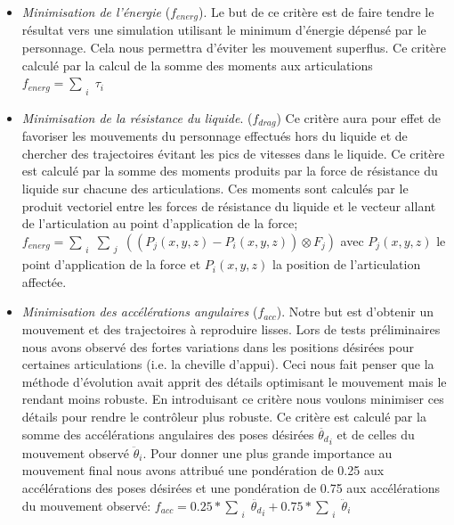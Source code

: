 \documentclass[runningheads,a4paper]{llncs}
\begin{document}
\begin{itemize}
\item{\textit{Minimisation de l'énergie} ($f_{energ}$). Le but de ce critère est de faire tendre le résultat vers une simulation utilisant le minimum d'énergie dépensé par le personnage. Cela nous permettra d'éviter les mouvement superflus. Ce critère calculé par la calcul de la somme des moments aux articulations $f_{energ}=\sum_{\substack{i}}{\tau_i}$} 
\item{\textit{Minimisation de la résistance du liquide}. ($f_{drag}$) Ce critère aura pour effet de favoriser les mouvements du personnage effectués hors du liquide et de chercher des trajectoires évitant les pics de vitesses dans le liquide. Ce critère est calculé par la somme des moments produits par la force de résistance du liquide sur chacune des articulations. Ces moments sont calculés par le produit vectoriel entre les forces de résistance du liquide et le vecteur allant de l'articulation au point d'application de la force; $f_{energ}=\sum_{\substack{i}}\sum_{\substack{j}}((P_j(x,y,z)-P_i(x,y,z)) \otimes  F_j)$ avec $P_j(x,y,z)$ le point d'application de la force et $P_i(x,y,z)$ la position de l'articulation affectée.}
\item{\textit{Minimisation des accélérations angulaires} ($f_{acc}$). Notre but est d'obtenir un mouvement et des trajectoires à reproduire lisses. Lors de tests préliminaires nous avons observé des fortes variations dans les positions désirées pour certaines articulations (i.e. la cheville d'appui). Ceci nous fait penser que la méthode d'évolution avait apprit des détails optimisant le mouvement mais le rendant moins robuste. En introduisant ce critère nous voulons minimiser ces détails pour rendre le contrôleur plus robuste. Ce critère est calculé par la somme des accélérations angulaires des poses désirées $\ddot{\theta_d}_i$ et de celles du mouvement observé $\ddot{\theta}_i$.  Pour donner une plus grande importance au mouvement final nous avons attribué une pondération de 0.25 aux accélérations des poses désirées et une pondération de 0.75 aux accélérations du mouvement observé: $f_{acc}=0.25*\sum_{\substack{i}}\ddot{\theta_d}_i+0.75*\sum_{\substack{i}}\ddot{\theta}_i$ }
\end{itemize}
\end{document}
